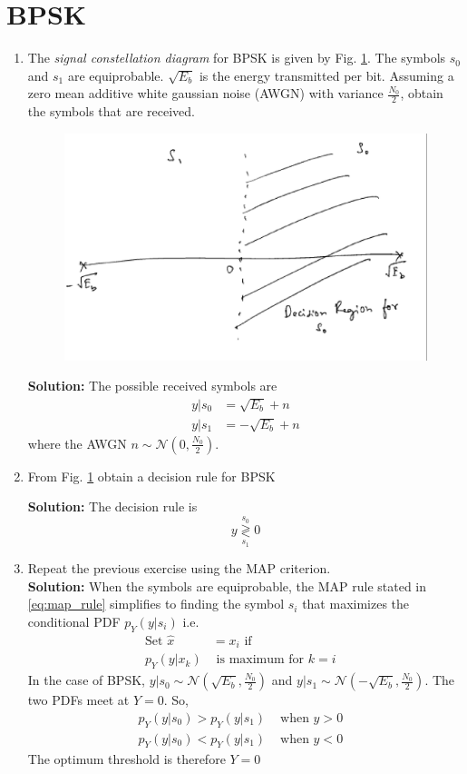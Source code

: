 \documentclass[journal,10pt,twocolumn]{IEEEtran}
\newcommand{\solution}{\noindent \textbf{Solution: }}
\providecommand{\dec}[2]{\ensuremath{\overset{#1}{\underset{#2}{\gtrless}}}}
\providecommand{\gauss}[2]{\mathcal{N}\ensuremath{\left(#1,#2\right)}}
\begin{document}
\section{BPSK}
\begin{enumerate}
\item
The {\em signal constellation diagram} for BPSK is given by Fig. \ref{fig:bpsk_const}.  The symbols $s_0$ and $s_1$ are equiprobable.  $\sqrt{E_b}$ is the energy transmitted per bit. Assuming a zero mean additive white gaussian noise (AWGN) with variance $\frac{N_0}{2}$,
obtain the symbols that are received.

%
\begin{figure}[H]
\centering
\includegraphics[width=\columnwidth]{./figs/chapter6/bpsk_const.eps}
\caption{}
\label{fig:bpsk_const}
\end{figure}
\solution The possible received symbols are
\begin{align}
y|s_0 &= \sqrt{E_b} + n
\\
y|s_1 &= -\sqrt{E_b} + n
\end{align}
%
where the AWGN $n \sim \gauss{0}{\frac{N_0}{2}}$.
%
\item
\label{prob:bpsk_decision}
From Fig. \ref{fig:bpsk_const} obtain a decision rule for BPSK

\solution The decision rule is
\begin{equation}
y \dec{s_0}{s_1} 0
\end{equation}
\item
Repeat the previous exercise using the MAP criterion.\\
\solution When the symbols are equiprobable, the MAP rule stated in \eqref{eq:map_rule} simplifies to finding the symbol $s_i$ that %
maximizes the conditional PDF $p_Y(y|s_i)$ i.e.
\begin{align}
	\label{eq:mle_rule}
	\text{Set } \hat{x} &= x_i \text{ if}&\\ \nonumber
	p_Y(y|x_k) &\text{ is maximum for } k = i
\end{align}
In the case of BPSK, $y|s_0 \sim \gauss{\sqrt{E_b}}{\frac{N_0}{2}}$ and $y|s_1 \sim \gauss{-\sqrt{E_b}}{\frac{N_0}{2}}$. %
The two PDFs meet at $Y=0$. So,
\begin{align*}
	p_Y(y|s_0) > p_Y(y|s_1) &\text{ when } y > 0&\\
	p_Y(y|s_0) < p_Y(y|s_1) &\text{ when } y < 0 	
\end{align*}
The optimum threshold is therefore $Y=0$


\end{enumerate}
\end{document}
